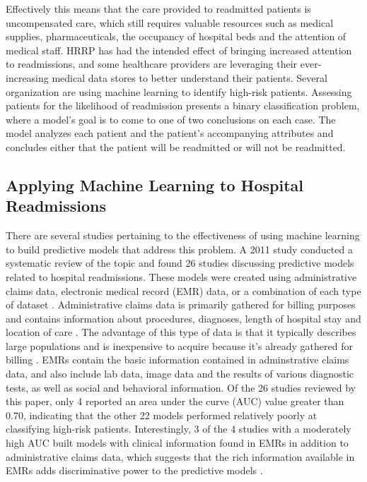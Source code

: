 \documentclass[sigconf]{acmart}
\begin{document}
Effectively this means that the care provided to readmitted patients is uncompensated care, which still requires valuable resources such as medical supplies, pharmaceuticals, the occupancy of hospital beds and the attention of medical staff. HRRP has had the intended effect of bringing increased attention to readmissions, and some healthcare providers are leveraging their ever-increasing medical data stores to better understand their patients. Several organization are using machine learning to identify high-risk patients. Assessing patients for the likelihood of readmission presents a binary classification problem, where a model's goal is to come to one of two conclusions on each case. The model analyzes each patient and the patient's accompanying attributes and concludes either that the patient will be readmitted or will not be readmitted.

\subsection{Applying Machine Learning to Hospital Readmissions}

There are several studies pertaining to the effectiveness of using machine learning to build predictive models that address this problem. A 2011 study conducted a systematic review of the topic and found 26 studies discussing predictive models related to hospital readmissions. These models were created using administrative claims data, electronic medical record (EMR) data, or a combination of each type of dataset \cite{cite08}. Administrative claims data is primarily gathered for billing purposes and contains information about procedures, diagnoses, length of hospital stay and location of care \cite{cite10}. The advantage of this type of data is that it typically describes large populations and is inexpensive to acquire because it's already gathered for billing \cite{cite05}. EMRs contain the basic information contained in adminstrative claims data, and also include lab data, image data and the results of various diagnostic tests, as well as social and behavioral information. Of the 26 studies reviewed by this paper, only 4 reported an area under the curve (AUC) value greater than 0.70, indicating that the other 22 models performed relatively poorly at classifying high-risk patients. Interestingly, 3 of the 4 studies with a moderately high AUC built models with clinical information found in EMRs in addition to administrative claims data, which suggests that the rich information available in EMRs adds discriminative power to the predictive models \cite{cite05}.
\end{document}
